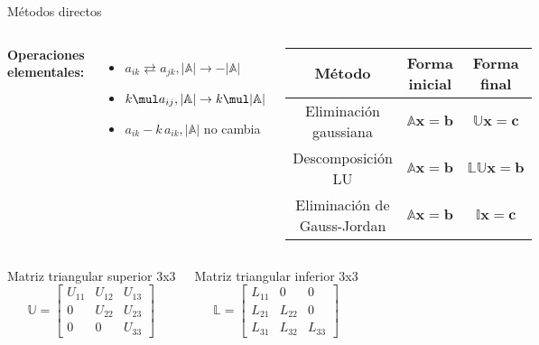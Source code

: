 \documentclass[9pt, aspectratio=169]{beamer}
\begin{document}
\begin{frame}{Métodos directos}
\begin{columns}[c]
\textbf{Operaciones elementales:}
\begin{itemize}
    \item $a_{ik} \rightleftarrows a_{jk}, |\mathbb{A}| \rightarrow -|\mathbb{A}|$
    \item $k \mul a_{ij}, |\mathbb{A}| \rightarrow k \mul |\mathbb{A}|$
    \item $a_{ik} - k \, a_{ik}, |\mathbb{A}|$ no cambia
\end{itemize} \pause
{}
 \begin{center}
\begin{tabular}{c c c}
\toprule
\textbf{Método} & \textbf{Forma inicial} & \textbf{Forma final} \\
\midrule
Eliminación gaussiana & $\mathbb{A} \mathbf{x} = \mathbf{b}$ & $\mathbb{U} \mathbf{x} = \mathbf{c}$ \\
Descomposición LU & $\mathbb{A} \mathbf{x} = \mathbf{b}$ & $ \mathbb{LU} \mathbf{x} = \mathbf{b}$ \\
Eliminación de Gauss-Jordan & $\mathbb{A} \mathbf{x} = \mathbf{b}$ & $\mathbb{I} \mathbf{x} = \mathbf{c}$ \\
\bottomrule
\end{tabular} 
\end{center}
\end{columns} \pause

\begin{columns}[t]
 Matriz triangular superior 3x3
\[
    \mathbb{U} = \begin{bmatrix} 
 U_{11} & U_{12} &  U_{13} \\
 0      & U_{22} &  U_{23} \\
 0      & 0      &  U_{33}
 \end{bmatrix} 
\]

Matriz triangular inferior 3x3
\[
    \mathbb{L} = \begin{bmatrix} 
 L_{11} & 0      & 0 \\
 L_{21} & L_{22} & 0 \\
 L_{31} & L_{32} & L_{33}
 \end{bmatrix} \] 
\end{columns}
\end{frame}
\end{document}
